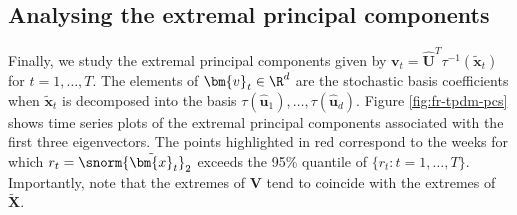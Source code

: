 \documentclass[en-GB, a4paper, nobind]{templates/bathreport}
\begin{document}
\hypertarget{analysing-the-extremal-principal-components}{%
\subsection{Analysing the extremal principal components}\label{analysing-the-extremal-principal-components}}

Finally, we study the extremal principal components given by \(\bm{v}_t = \hat{\bm{U}}^T\tau^{-1}(\tilde{\bm{x}}_t)\) for \(t=1,\ldots,T\). The elements of \(\bm{v}_t\in\R^d\) are the stochastic basis coefficients when \(\tilde{\bm{x}}_t\) is decomposed into the basis \(\tau(\hat{\bm{u}}_1),\ldots,\tau(\hat{\bm{u}}_d)\). Figure \ref{fig:fr-tpdm-pcs} shows time series plots of the extremal principal components associated with the first three eigenvectors. The points highlighted in red correspond to the weeks for which \(r_t=\snorm{\tilde{\bm{x}}_t}_2\) exceeds the 95\% quantile of \(\{r_t:t=1,\ldots,T\}\). Importantly, note that the extremes of \(\bm{V}\) tend to coincide with the extremes of \(\tilde{\bm{X}}\).
\end{document}
